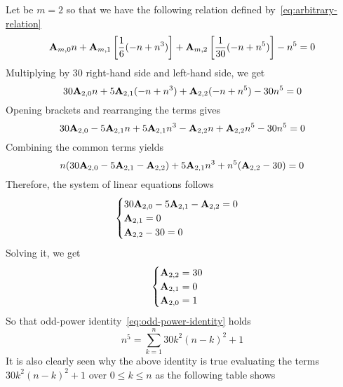 \begin{examp}
    Let be $m=2$ so that we have the following relation defined by~\eqref{eq:arbitrary-relation}
    \begin{equation*}
        {\mathbf{A}} \sb{m,0} n
        + {\mathbf{A}} \sb{m,1} \left[ \frac{1}{6} (-n + n^3) \right]
        + {\mathbf{A}} \sb{m,2} \left[ \frac{1}{30} (-n + n^5) \right] - n^5 = 0
    \end{equation*}
    Multiplying by $30$ right-hand side and left-hand side, we get
    \begin{equation*}
        30 {\mathbf{A}} \sb{2,0} n + 5 {\mathbf{A}} \sb{2,1} (-n + n^3) + {\mathbf{A}} \sb{2,2} (-n + n^5) - 30n^5 = 0
    \end{equation*}
    Opening brackets and rearranging the terms gives
    \begin{equation*}
        30 {\mathbf{A}} \sb{2,0} - 5 {\mathbf{A}} \sb{2,1} n + 5 {\mathbf{A}} \sb{2,1} n^3 - {\mathbf{A}} \sb{2,2} n + {\mathbf{A}} \sb{2,2} n^5 - 30n^5 = 0
    \end{equation*}
    Combining the common terms yields
    \begin{equation*}
        n (30 {\mathbf{A}} \sb{2,0} - 5 {\mathbf{A}} \sb{2,1} - {\mathbf{A}} \sb{2,2}) + 5 {\mathbf{A}} \sb{2,1} n^3 + n^5 ({\mathbf{A}} \sb{2,2} - 30) = 0
    \end{equation*}
    Therefore, the system of linear equations follows
    \begin{equation*}
        \begin{cases}
            30 {\mathbf{A}} \sb{2,0} - 5 {\mathbf{A}} \sb{2,1} - {\mathbf{A}} \sb{2,2} = 0 \\
            {\mathbf{A}} \sb{2,1} = 0 \\
            {\mathbf{A}} \sb{2,2} - 30 = 0
        \end{cases}
    \end{equation*}
    Solving it, we get
    \begin{equation*}
        \begin{cases}
            {\mathbf{A}} \sb{2,2} = 30 \\
            {\mathbf{A}} \sb{2,1} = 0 \\
            {\mathbf{A}} \sb{2,0} = 1
        \end{cases}
    \end{equation*}
    So that odd-power identity~\eqref{eq:odd-power-identity} holds
    \begin{equation*}
        n^5 = \sum_{k=1}^{n} 30k^2(n-k)^2 + 1
    \end{equation*}
    It is also clearly seen
    why the above identity is true evaluating the terms $30k^2(n-k)^2 + 1$ over $0 \leq k \leq n$ as
    the following table shows
    
\end{examp}
